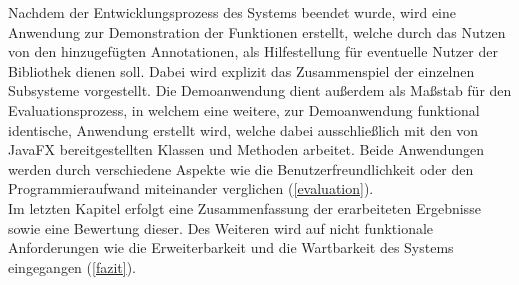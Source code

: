 Nachdem der Entwicklungsprozess des Systems beendet wurde, wird eine Anwendung zur Demonstration der Funktionen erstellt, welche durch das Nutzen von den hinzugefügten Annotationen, als Hilfestellung für eventuelle Nutzer der Bibliothek dienen soll. Dabei wird explizit das Zusammenspiel der einzelnen Subsysteme vorgestellt. Die Demoanwendung dient außerdem als Maßstab für den Evaluationsprozess, in welchem eine weitere, zur Demoanwendung funktional identische, Anwendung erstellt wird, welche dabei ausschließlich mit den von JavaFX bereitgestellten Klassen und Methoden arbeitet. Beide Anwendungen werden durch verschiedene Aspekte wie die Benutzerfreundlichkeit oder den Programmieraufwand miteinander verglichen (\ref{evaluation}).\\
Im letzten Kapitel erfolgt eine Zusammenfassung der erarbeiteten Ergebnisse sowie eine Bewertung dieser. Des Weiteren wird auf nicht funktionale Anforderungen wie die Erweiterbarkeit und die Wartbarkeit des Systems eingegangen (\ref{fazit}).